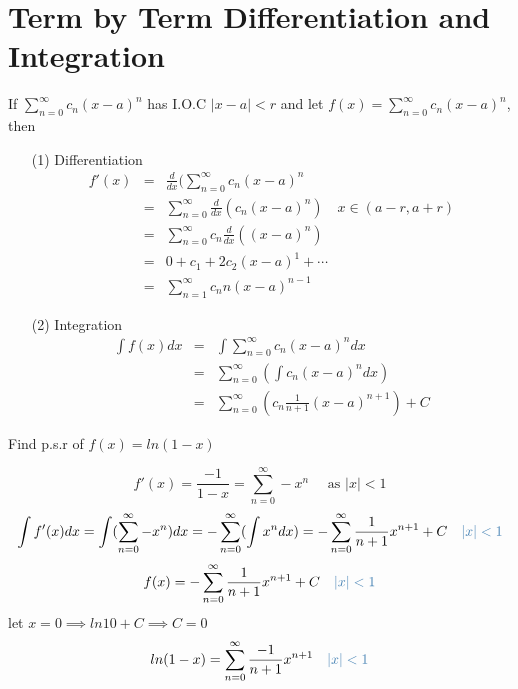 \section{Term by Term Differentiation and Integration}
\begin{theorem}
If \(\displaystyle \sum^{\infty}_{n = 0} c_n (x - a)^n\) has I.O.C \(|x - a| < r\) and let \(\displaystyle f(x) = \sum^{\infty}_{n = 0} c_n (x - a)^n\), then
\begin{itemize}
\item[(1)] Differentiation
\[\begin{array}{rcl}
\displaystyle f'(x) & = & \displaystyle  \frac{d}{dx} (\sum^{\infty}_{n = 0} c_n (x - a)^n\\
& = & \displaystyle \sum^{\infty}_{n = 0} \frac{d}{dx}(c_n (x - a)^n) \quad x \in (a - r, a + r)\\
& = & \displaystyle \sum^{\infty}_{n = 0} c_n \frac{d}{dx} ((x- a)^n)\\
& = & \displaystyle 0 + c_1 + 2c_2(x - a)^1 + \cdots\\
& = & \displaystyle \sum^{\infty}_{n = 1} c_n n(x - a)^{n - 1}
\end{array}\]
\item[(2)] Integration
\[\begin{array}{rcl}
\displaystyle \int f(x) dx & = & \displaystyle \int \sum^{\infty}_{n = 0} c_n (x - a)^n dx\\
& = & \displaystyle \sum^{\infty}_{n = 0} (\int c_n (x - a)^n dx)\\
& = & \displaystyle \sum^{\infty}_{n =0} (c_n \frac{1}{n + 1} (x - a)^{n + 1}) + C
\end{array}\]
\end{itemize}
\end{theorem}
\begin{eg}
Find p.s.r of \(\displaystyle f(x) = ln (1 - x)\)

\soln
\[\displaystyle f'(x) = \frac{-1}{1 - x} = \sum^{\infty}_{n = 0} - x^n \quad \text{ as } |x| < 1\]
\[ \displaystyle \int f'(x) dx = \int (\sum^{\infty}_{n = 0} -x^n) dx = - \sum^{\infty}_{n = 0} (\int x^n dx) = - \sum^{\infty}_{n = 0} \frac{1}{n + 1} x^{n + 1} + C \quad \tssteelblue{|x| < 1}\]
\[\displaystyle f(x) = - \sum^{\infty}_{n = 0} \frac{1}{n + 1} x^{n + 1} + C \quad \tssteelblue{|x| < 1}\]
let \(\displaystyle x = 0 \implies ln 1 0 + C \implies C = 0\)
\[ln (1 - x) = \sum^{\infty}_{n = 0} \frac{-1}{n + 1} x^{n + 1} \quad \tssteelblue{|x| < 1}\]
\end{eg}
